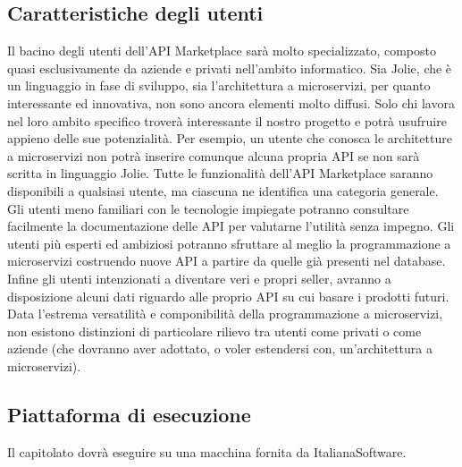 \subsection{Caratteristiche degli utenti}
Il bacino degli utenti dell'API Marketplace sarà molto specializzato, composto quasi esclusivamente da aziende e privati nell'ambito informatico. Sia Jolie, che è un linguaggio in fase di sviluppo, sia l'architettura a microservizi, per quanto interessante ed innovativa, non sono ancora elementi molto diffusi. Solo chi lavora nel loro ambito specifico troverà interessante il nostro progetto e potrà usufruire appieno delle sue potenzialità. Per esempio, un utente che conosca le architetture a microservizi non potrà inserire comunque alcuna propria API se non sarà scritta in linguaggio Jolie. Tutte le funzionalità dell'API Marketplace saranno disponibili a qualsiasi utente, ma ciascuna ne identifica una categoria generale. Gli utenti meno familiari con le tecnologie impiegate potranno consultare facilmente la documentazione delle API per valutarne l'utilità senza impegno. Gli utenti più esperti ed ambiziosi potranno sfruttare al meglio la programmazione a microservizi costruendo nuove API a partire da quelle già presenti nel database. Infine gli utenti intenzionati a diventare veri e propri seller, avranno a disposizione alcuni dati riguardo alle proprio API su cui basare i prodotti futuri. Data l'estrema versatilità e componibilità della programmazione a microservizi, non esistono distinzioni di particolare rilievo tra utenti come privati o come aziende (che dovranno aver adottato, o voler estendersi con, un'architettura a microservizi).

\subsection{Piattaforma di esecuzione}
Il capitolato dovrà eseguire su una macchina fornita da ItalianaSoftware.


